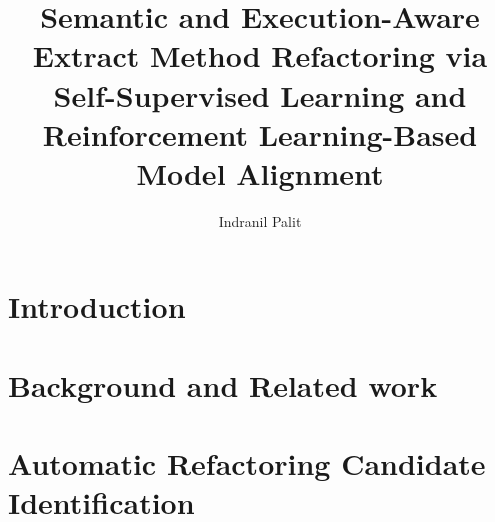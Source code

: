 \documentclass[12pt, glossary]{dalthesis}
\begin{document}
\title{Semantic and Execution-Aware Extract Method Refactoring via Self-Supervised Learning and Reinforcement Learning-Based Model Alignment}
\author{Indranil Palit}
\mcs  %








\frontmatter




\begin{acknowledgements}

\end{acknowledgements}

\mainmatter


\chapter{Introduction}


\chapter{Background and Related work}


\chapter{Automatic Refactoring Candidate Identification}

\end{document}
